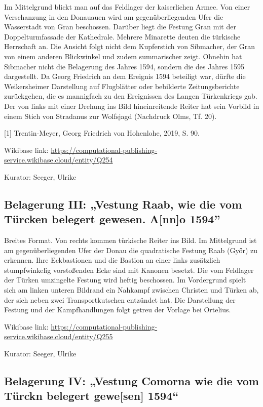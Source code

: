 \documentclass[
  letterpaper,
]{book}
\begin{document}
Im Mittelgrund blickt man auf das Feldlager der kaiserlichen Armee. Von
einer Verschanzung in den Donauauen wird am gegenüberliegenden Ufer die
Wasserstadt von Gran beschossen. Darüber liegt die Festung Gran mit der
Doppelturmfassade der Kathedrale. Mehrere Minarette deuten die türkische
Herrschaft an. Die Ansicht folgt nicht dem Kupferstich von Sibmacher,
der Gran von einem anderen Blickwinkel und zudem summarischer zeigt.
Ohnehin hat Sibmacher nicht die Belagerung des Jahres 1594, sondern die
des Jahres 1595 dargestellt. Da Georg Friedrich an dem Ereignis 1594
beteiligt war, dürfte die Weikersheimer Darstellung auf Flugblätter oder
bebilderte Zeitungsberichte zurückgehen, die es mannigfach zu den
Ereignissen des Langen Türkenkriegs gab. Der von links mit einer Drehung
ins Bild hineinreitende Reiter hat sein Vorbild in einem Stich von
Stradanus zur Wolfsjagd (Nachdruck Olms, Tf. 20).

{[}1{]} Trentin-Meyer, Georg Friedrich von Hohenlohe, 2019, S. 90.

Wikibase link:
\url{https://computational-publishing-service.wikibase.cloud/entity/Q254}

Kurator: Seeger, Ulrike

\subsection{Belagerung III: „Vestung Raab, wie die vom Türcken belegert
gewesen. A{[}nn{]}o
1594''}\label{belagerung-iii-vestung-raab-wie-die-vom-tuxfcrcken-belegert-gewesen.-anno-1594}

Breites Format. Von rechts kommen türkische Reiter ins Bild. Im
Mittelgrund ist am gegenüberliegenden Ufer der Donau die quadratische
Festung Raab (Győr) zu erkennen. Ihre Eckbastionen und die Bastion an
einer links zusätzlich stumpfwinkelig vorstoßenden Ecke sind mit Kanonen
besetzt. Die vom Feldlager der Türken umzingelte Festung wird heftig
beschossen. Im Vordergrund spielt sich am linken unteren Bildrand ein
Nahkampf zwischen Christen und Türken ab, der sich neben zwei
Transportkutschen entzündet hat. Die Darstellung der Festung und der
Kampfhandlungen folgt getreu der Vorlage bei Ortelius.

Wikibase link:
\url{https://computational-publishing-service.wikibase.cloud/entity/Q255}

Kurator: Seeger, Ulrike

\subsection{Belagerung IV: „Vestung Comorna wie die vom Türckn belegert
gewe{[}sen{]}
1594``}\label{belagerung-iv-vestung-comorna-wie-die-vom-tuxfcrckn-belegert-gewesen-1594}
\end{document}
